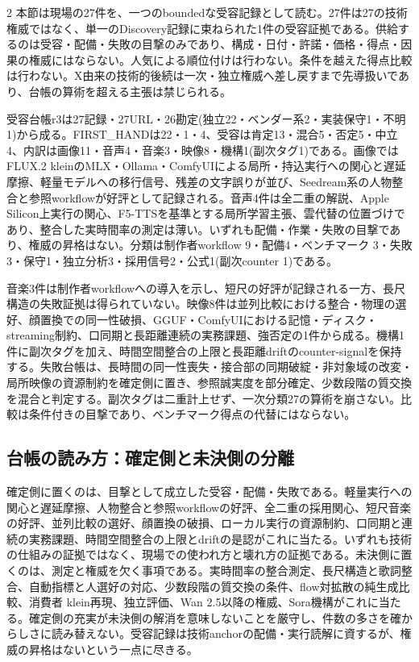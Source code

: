 \documentclass[lualatex,a4paper,10pt]{jlreq}
\begin{document}
\begin{multicols}{2}
\raggedcolumns
本節は現場の27件を、一つのboundedな受容記録として読む。27件は27の技術権威ではなく、単一のDiscovery記録に束ねられた1件の受容証拠である\autocite{btd139}。供給するのは受容・配備・失敗の目撃のみであり、構成・日付・許諾・価格・得点・因果の権威にはならない。人気による順位付けは行わない。条件を越えた得点比較は行わない。X由来の技術的後続は一次・独立権威へ差し戻すまで先導扱いであり、台帳の算術を超える主張は禁じられる。

受容台帳r3は27記録・27URL・26勘定(独立22・ベンダー系2・実装保守1・不明1)から成る\autocite{btd139}。FIRST\_HANDは22・1・4、受容は肯定13・混合5・否定5・中立4、内訳は画像11・音声4・音楽3・映像8・機構1(副次タグ1)である。画像ではFLUX.2 kleinのMLX・Ollama・ComfyUIによる局所・持込実行への関心と遅延摩擦、軽量モデルへの移行信号、残差の文字誤りが並び、Seedream系の人物整合と参照workflowが好評として記録される。音声4件は全二重の解説、Apple Silicon上実行の関心、F5-TTSを基準とする局所学習主張、雲代替の位置づけであり、整合した実時間率の測定は薄い\autocite{btd139}。いずれも配備・作業・失敗の目撃であり、権威の昇格はない。分類は制作者workflow 9・配備4・ベンチマーク 3・失敗3・保守1・独立分析3・採用信号2・公式1(副次counter 1)である。

音楽3件は制作者workflowへの導入を示し、短尺の好評が記録される一方、長尺構造の失敗証拠は得られていない\autocite{btd139}。映像8件は並列比較における整合・物理の選好、顔置換での同一性破損、GGUF・ComfyUIにおける記憶・ディスク・streaming制約、口同期と長距離連続の実務課題、強否定の1件から成る。機構1件に副次タグを加え、時間空間整合の上限と長距離driftのcounter-signalを保持する。失敗台帳は、長時間の同一性喪失・接合部の同期破綻・非対象域の改変・局所映像の資源制約を確定側に置き、参照誠実度を部分確定、少数段階の質交換を混合と判定する\autocite{btd139}。副次タグは二重計上せず、一次分類27の算術を崩さない。比較は条件付きの目撃であり、ベンチマーク得点の代替にはならない。

\subsection{台帳の読み方：確定側と未決側の分離}
確定側に置くのは、目撃として成立した受容・配備・失敗である。軽量実行への関心と遅延摩擦、人物整合と参照workflowの好評、全二重の採用関心、短尺音楽の好評、並列比較の選好、顔置換の破損、ローカル実行の資源制約、口同期と連続の実務課題、時間空間整合の上限とdriftの是認がこれに当たる\autocite{btd139}。いずれも技術の仕組みの証拠ではなく、現場での使われ方と壊れ方の証拠である。未決側に置くのは、測定と権威を欠く事項である。実時間率の整合測定、長尺構造と歌詞整合、自動指標と人選好の対応、少数段階の質交換の条件、flow対拡散の純生成比較、消費者 klein再現、独立評価、Wan 2.5以降の権威、Sora機構がこれに当たる\autocite{btd139}。確定側の充実が未決側の解消を意味しないことを厳守し、件数の多さを確からしさに読み替えない。受容記録は技術anchorの配備・実行読解に資するが、権威の昇格はないという一点に尽きる。


\end{multicols}
\end{document}

